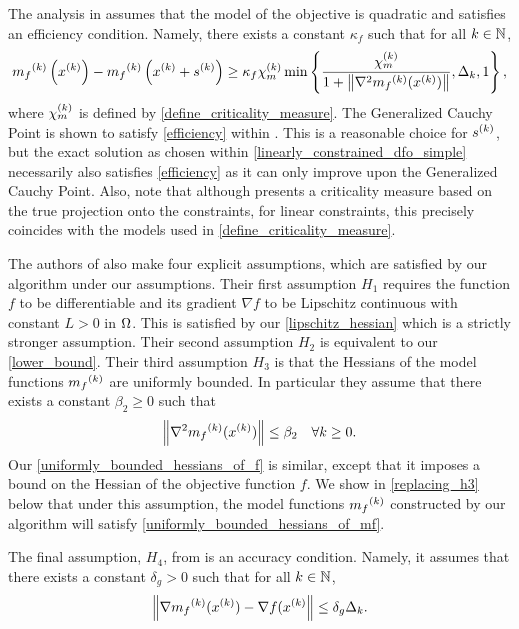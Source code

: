 \documentclass{article}
\begin{document}
The analysis in \cite{Conejo:2013:GCT:2620806.2621814}  assumes that the model of the objective is quadratic and satisfies an efficiency condition.
Namely, there exists a constant $\kappa_f$ such that for all $k \in \mathbb N$,  
\begin{align}
\label{efficiency}
{{m}_f}^{(k)}\left(x^{(k)}\right) - {{m}_f}^{(k)}\left(x^{(k)} + {{s}^{(k)}}\right) \ge \kappa_f {\chi_m^{(k)}} \min\left\{ \frac{{\chi_m^{(k)}}}{1+\left\|\nabla^2 {{m}_f}^{(k)}(x^{(k)})\right\|}, \Delta_k, 1 \right\},
\end{align}
where ${\chi_m^{(k)}}$ is defined by \cref{define_criticality_measure}.
The Generalized Cauchy Point is shown to satisfy \cref{efficiency} within \cite{Conn:2000:TM:357813}.
This is a reasonable choice for ${{s}^{(k)}}$, but the exact solution as chosen within \cref{linearly_constrained_dfo_simple} 
necessarily also satisfies \cref{efficiency} as it can only improve upon the Generalized Cauchy Point.
Also, note that although \cite{Conejo:2013:GCT:2620806.2621814} presents a criticality measure based on the true projection onto the constraints,
for linear constraints, this precisely coincides with the models used in \cref{define_criticality_measure}.

The authors of \cite{Conejo:2013:GCT:2620806.2621814} also make four explicit assumptions, which are satisfied by our algorithm under our assumptions.     
Their first assumption $H_1$ requires the function $f$ to be differentiable and its gradient $\nabla f$ to be Lipschitz continuous with constant $L > 0$ in $\Omega$.  This is satisfied by our 
\cref{lipschitz_hessian} which is a strictly stronger assumption.
Their second assumption $H_2$ is equivalent to our \cref{lower_bound}.    Their third assumption $H_3$ is that
the Hessians of the model functions ${{m}_f}^{(k)}$ are uniformly bounded.    In particular they assume that there exists a constant $\beta_2 \ge 0$ such that
\begin{equation}\label{uniformly_bounded_hessians_of_mf}
 \left\|\nabla^2 {{m}_f}^{(k)}(x^{(k)})\right\| \le \beta_2 \quad \forall k \ge 0.
 \end{equation}
Our  \cref{uniformly_bounded_hessians_of_f}
 is similar, except that it imposes a bound on the Hessian of the objective function $f$.    We show in \cref{replacing_h3} below that under this assumption,  the model functions ${{m}_f}^{(k)}$ constructed by our algorithm will satisfy \cref{uniformly_bounded_hessians_of_mf}.

The final assumption, $H_4$,  from \cite{Conejo:2013:GCT:2620806.2621814} is an accuracy condition.  Namely, it assumes that there exists a constant $\delta_g > 0$ such that for all $k \in \mathbb N$, 
\begin{equation}\label{accuracy}
\left\| \nabla {{m}_f}^{(k)}(x^{(k)}) - \nabla f(x^{(k)} \right\| \le \delta_g \Delta_k.
\end{equation}
\end{document}
